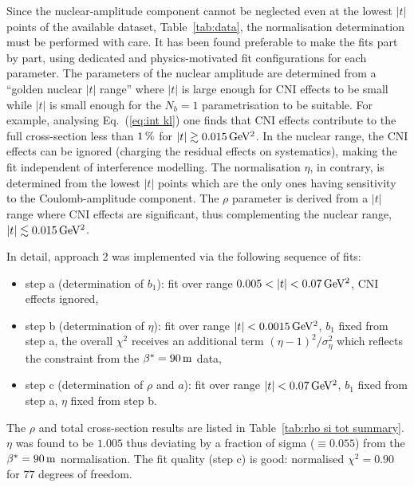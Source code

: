 Since the nuclear-amplitude component cannot be neglected even at the lowest $|t|$ points of the available dataset, Table~\ref{tab:data}, the normalisation determination must be performed with care. It has been found preferable to make the fits part by part, using dedicated and physics-motivated fit configurations for each parameter. The parameters of the nuclear amplitude are determined from a ``golden nuclear $|t|$ range'' where $|t|$ is large enough for CNI effects to be small while $|t|$ is small enough for the $N_b = 1$ parametrisation to be suitable. For example, analysing Eq.~(\ref{eq:int kl}) one finds that CNI effects contribute to the full cross-section less than $1\,{\rm \%}$ for $|t| \gtrsim 0.015\,{\rm GeV^2}$. In the nuclear range, the CNI effects can be ignored (charging the residual effects on systematics), making the fit independent of interference modelling. The normalisation $\eta$, in contrary, is determined from the lowest $|t|$ points which are the only ones having sensitivity to the Coulomb-amplitude component. The $\rho$ parameter is derived from a $|t|$ range where CNI effects are significant, thus complementing the nuclear range, $|t| \lesssim 0.015\,{\rm GeV^2}$.

In detail, approach 2 was implemented via the following sequence of fits:
\begin{itemize}
\item step a (determination of $b_1$): fit over range $0.005 < |t| < 0.07\,{\rm GeV^2}$, CNI effects ignored,
\item step b (determination of $\eta$): fit over range $|t| < 0.0015\,{\rm GeV^2}$, $b_1$ fixed from step a, the overall $\chi^2$ receives an additional term $(\eta - 1)^2/ \sigma_\eta^2$ which reflects the constraint from the $\beta^* = 90\,{\rm m}$ data,
\item step c (determination of $\rho$ and $a$): fit over range $|t| < 0.07\,{\rm GeV^2}$, $b_1$ fixed from step a, $\eta$ fixed from step b.
\end{itemize}
The $\rho$ and total cross-section results are listed in Table~\ref{tab:rho si tot summary}. $\eta$ was found to be $1.005$ thus deviating by a fraction of sigma ($\equiv 0.055$) from the $\beta^* = 90\,{\rm m}$ normalisation. The fit quality (step c) is good: normalised $\chi^2 = 0.90$ for $77$ degrees of freedom.

